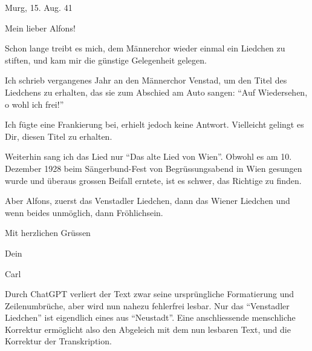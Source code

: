 \documentclass[12pt, a4paper, ngerman, bidi=default]{article}
\begin{document}
\begin{tcolorbox}[colback=oldLetter, colframe=black, sharp corners, width=\textwidth]
Murg, 15. Aug. 41

Mein lieber Alfons!

Schon lange treibt es mich, dem Männerchor wieder einmal ein Liedchen zu stiften, und kam mir die günstige Gelegenheit gelegen.

Ich schrieb vergangenes Jahr an den Männerchor Venstad, um den Titel des Liedchens zu erhalten, das sie zum Abschied am Auto sangen: \enquote{Auf Wiedersehen, o wohl ich frei!}

Ich fügte eine Frankierung bei, erhielt jedoch keine Antwort. Vielleicht gelingt es Dir, diesen Titel zu erhalten.

Weiterhin sang ich das Lied nur \enquote{Das alte Lied von Wien}. Obwohl es am 10. Dezember 1928 beim Sängerbund-Fest von Begrüssungsabend in Wien gesungen wurde und überaus grossen Beifall erntete, ist es schwer, das Richtige zu finden.

Aber Alfons, zuerst das Venstadler Liedchen, dann das Wiener Liedchen und wenn beides unmöglich, dann Fröhlichsein.

Mit herzlichen Grüssen

Dein

Carl
\end{tcolorbox}

\label{fig:brief-carl-alfons}

Durch ChatGPT verliert der Text zwar seine ursprüngliche Formatierung und Zeilenumbrüche, aber wird nun nahezu fehlerfrei lesbar. Nur das \enquote{Venstadler Liedchen} ist eigendlich eines aus \enquote{Neustadt}. Eine anschliessende menschliche Korrektur ermöglicht also den Abgeleich mit dem nun lesbaren Text, und die Korrektur der Transkription.
\end{document}

